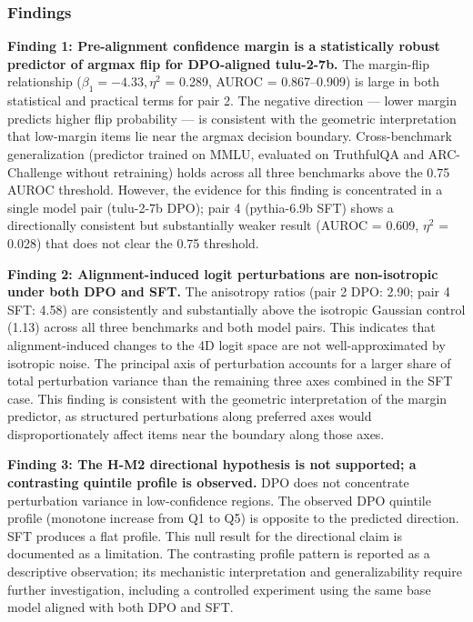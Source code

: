 
\subsubsection{Findings}

\textbf{Finding 1: Pre-alignment confidence margin is a statistically robust predictor of argmax flip for DPO-aligned tulu-2-7b.} The margin-flip relationship ($\beta _1 = -4.33, \eta^2$ = 0.289, AUROC = 0.867--0.909) is large in both statistical and practical terms for pair 2. The negative direction --- lower margin predicts higher flip probability --- is consistent with the geometric interpretation that low-margin items lie near the argmax decision boundary. Cross-benchmark generalization (predictor trained on MMLU, evaluated on TruthfulQA and ARC-Challenge without retraining) holds across all three benchmarks above the 0.75 AUROC threshold. However, the evidence for this finding is concentrated in a single model pair (tulu-2-7b DPO); pair 4 (pythia-6.9b SFT) shows a directionally consistent but substantially weaker result (AUROC = 0.609, $\eta^2$ = 0.028) that does not clear the 0.75 threshold.

\textbf{Finding 2: Alignment-induced logit perturbations are non-isotropic under both DPO and SFT.} The anisotropy ratios (pair 2 DPO: 2.90; pair 4 SFT: 4.58) are consistently and substantially above the isotropic Gaussian control (1.13) across all three benchmarks and both model pairs. This indicates that alignment-induced changes to the 4D logit space are not well-approximated by isotropic noise. The principal axis of perturbation accounts for a larger share of total perturbation variance than the remaining three axes combined in the SFT case. This finding is consistent with the geometric interpretation of the margin predictor, as structured perturbations along preferred axes would disproportionately affect items near the boundary along those axes.

\textbf{Finding 3: The H-M2 directional hypothesis is not supported; a contrasting quintile profile is observed.} DPO does not concentrate perturbation variance in low-confidence regions. The observed DPO quintile profile (monotone increase from Q1 to Q5) is opposite to the predicted direction. SFT produces a flat profile. This null result for the directional claim is documented as a limitation. The contrasting profile pattern is reported as a descriptive observation; its mechanistic interpretation and generalizability require further investigation, including a controlled experiment using the same base model aligned with both DPO and SFT.

